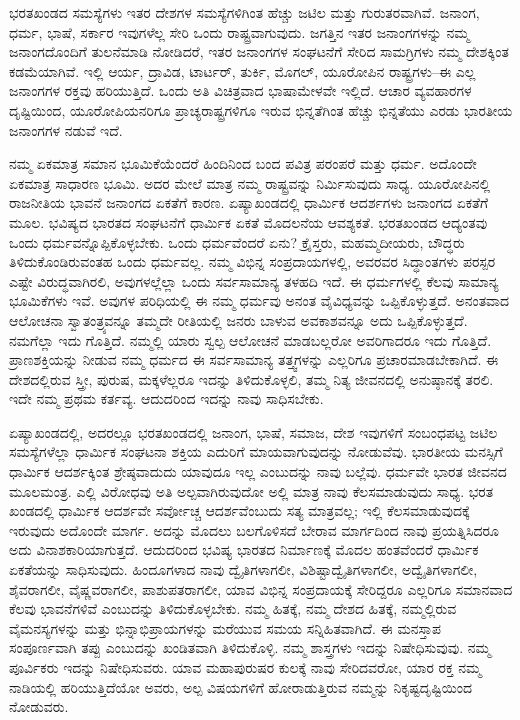 ಭರತಖಂಡದ ಸಮಸ್ಯೆಗಳು ಇತರ ದೇಶಗಳ ಸಮಸ್ಯೆಗಳಿಗಿಂತ ಹೆಚ್ಚು ಜಟಿಲ ಮತ್ತು ಗುರುತರವಾಗಿವೆ. ಜನಾಂಗ, ಧರ್ಮ, ಭಾಷೆ, ಸರ್ಕಾರ ಇವುಗಳೆಲ್ಲ ಸೇರಿ ಒಂದು ರಾಷ್ಟ್ರವಾಗುವುದು. ಜಗತ್ತಿನ ಇತರ ಜನಾಂಗಗಳನ್ನು ನಮ್ಮ ಜನಾಂಗದೊಂದಿಗೆ ತುಲನೆಮಾಡಿ ನೋಡಿದರೆ, ಇತರ ಜನಾಂಗಗಳ ಸಂಘಟನೆಗೆ ಸೇರಿದ ಸಾಮಗ್ರಿಗಳು ನಮ್ಮ ದೇಶಕ್ಕಿಂತ ಕಡಮೆಯಾಗಿವೆ. ಇಲ್ಲಿ ಆರ್ಯ, ದ್ರಾವಿಡ, ಟಾರ್ಟರ್​, ತುರ್ಕಿ, ಮೊಗಲ್​, ಯೂರೋಪಿನ ರಾಷ್ಟ್ರಗಳು–ಈ ಎಲ್ಲ ಜನಾಂಗಗಳ ರಕ್ತವು ಹರಿಯುತ್ತಿದೆ. ಒಂದು ಅತಿ ವಿಚಿತ್ರವಾದ ಭಾಷಾಮೇಳವೇ ಇಲ್ಲಿದೆ. ಆಚಾರ ವ್ಯವಹಾರಗಳ ದೃಷ್ಟಿಯಿಂದ, ಯೂರೋಪಿಯನರಿಗೂ ಪ್ರಾಚ್ಯರಾಷ್ಟ್ರಗಳಿಗೂ ಇರುವ ಭಿನ್ನತೆಗಿಂತ ಹೆಚ್ಚು ಭಿನ್ನತೆಯು ಎರಡು ಭಾರತೀಯ ಜನಾಂಗಗಳ ನಡುವೆ ಇದೆ.

ನಮ್ಮ ಏಕಮಾತ್ರ ಸಮಾನ ಭೂಮಿಕೆಯೆಂದರೆ ಹಿಂದಿನಿಂದ ಬಂದ ಪವಿತ್ರ ಪರಂಪರೆ ಮತ್ತು ಧರ್ಮ. ಅದೊಂದೇ ಏಕಮಾತ್ರ ಸಾಧಾರಣ ಭೂಮಿ. ಅದರ ಮೇಲೆ ಮಾತ್ರ ನಮ್ಮ ರಾಷ್ಟ್ರವನ್ನು ನಿರ್ಮಿಸುವುದು ಸಾಧ್ಯ. ಯೂರೋಪಿನಲ್ಲಿ ರಾಜನೀತಿಯ ಭಾವನೆ ಜನಾಂಗದ ಏಕತೆಗೆ ಕಾರಣ. ಏಷ್ಯಾಖಂಡದಲ್ಲಿ ಧಾರ್ಮಿಕ ಆದರ್ಶಗಳು ಜನಾಂಗದ ಏಕತೆಗೆ ಮೂಲ. ಭವಿಷ್ಯದ ಭಾರತದ ಸಂಘಟನೆಗೆ ಧಾರ್ಮಿಕ ಏಕತೆ ಮೊದಲನೆಯ ಆವಶ್ಯಕತೆ. ಭರತಖಂಡದ ಆದ್ಯಂತವು ಒಂದು ಧರ್ಮವನ್ನೊಪ್ಪಿಕೊಳ್ಳಬೇಕು. ಒಂದು ಧರ್ಮವೆಂದರೆ ಏನು? ಕ್ರೈಸ್ತರು, ಮಹಮ್ಮದೀಯರು, ಬೌದ್ಧರು ತಿಳಿದುಕೊಂಡಿರುವಂತಹ ಒಂದು ಧರ್ಮವಲ್ಲ. ನಮ್ಮ ವಿಭಿನ್ನ ಸಂಪ್ರದಾಯಗಳಲ್ಲಿ, ಅವರವರ ಸಿದ್ಧಾಂತಗಳು ಪರಸ್ಪರ ಎಷ್ಟೇ ವಿರುದ್ಧವಾಗಿರಲಿ, ಅವುಗಳಲ್ಲೆಲ್ಲಾ ಒಂದು ಸರ್ವಸಾಮಾನ್ಯ ತಳಹದಿ ಇದೆ. ಈ ಧರ್ಮಗಳಲ್ಲಿ ಕೆಲವು ಸಾಮಾನ್ಯ ಭೂಮಿಕೆಗಳು ಇವೆ. ಅವುಗಳ ಪರಿಧಿಯಲ್ಲಿ ಈ ನಮ್ಮ ಧರ್ಮವು ಅನಂತ ವೈವಿಧ್ಯವನ್ನು ಒಪ್ಪಿಕೊಳ್ಳುತ್ತದೆ. ಅನಂತವಾದ ಆಲೋಚನಾ ಸ್ವಾತಂತ್ರ್ಯವನ್ನೂ ತಮ್ಮದೇ ರೀತಿಯಲ್ಲಿ ಜನರು ಬಾಳುವ ಅವಕಾಶವನ್ನೂ ಅದು ಒಪ್ಪಿಕೊಳ್ಳುತ್ತದೆ. ನಮಗೆಲ್ಲಾ ಇದು ಗೊತ್ತಿದೆ. ನಮ್ಮಲ್ಲಿ ಯಾರು ಸ್ವಲ್ಪ ಆಲೋಚನೆ ಮಾಡಬಲ್ಲರೋ ಅವರಿಗಾದರೂ ಇದು ಗೊತ್ತಿದೆ. ಪ್ರಾಣಶಕ್ತಿಯನ್ನು ನೀಡುವ ನಮ್ಮ ಧರ್ಮದ ಈ ಸರ್ವಸಾಮಾನ್ಯ ತತ್ತ್ವಗಳನ್ನು ಎಲ್ಲರಿಗೂ ಪ್ರಚಾರಮಾಡಬೇಕಾಗಿದೆ. ಈ ದೇಶದಲ್ಲಿರುವ ಸ್ತ್ರೀ, ಪುರುಷ, ಮಕ್ಕಳೆಲ್ಲರೂ ಇದನ್ನು ತಿಳಿದುಕೊಳ್ಳಲಿ, ತಮ್ಮ ನಿತ್ಯ ಜೀವನದಲ್ಲಿ ಅನುಷ್ಠಾನಕ್ಕೆ ತರಲಿ. ಇದೇ ನಮ್ಮ ಪ್ರಥಮ ಕರ್ತವ್ಯ. ಆದುದರಿಂದ ಇದನ್ನು ನಾವು ಸಾಧಿಸಬೇಕು.

ಏಷ್ಯಾಖಂಡದಲ್ಲಿ, ಅದರಲ್ಲೂ ಭರತಖಂಡದಲ್ಲಿ ಜನಾಂಗ, ಭಾಷೆ, ಸಮಾಜ, ದೇಶ ಇವುಗಳಿಗೆ ಸಂಬಂಧಪಟ್ಟ ಜಟಿಲ ಸಮಸ್ಯೆಗಳೆಲ್ಲಾ ಧಾರ್ಮಿಕ ಸಂಘಟನಾ ಶಕ್ತಿಯ ಎದುರಿಗೆ ಮಾಯವಾಗುವುದನ್ನು ನೋಡುವೆವು. ಭಾರತೀಯ ಮನಸ್ಸಿಗೆ ಧಾರ್ಮಿಕ ಆದರ್ಶಕ್ಕಿಂತ ಶ್ರೇಷ್ಠವಾದುದು ಯಾವುದೂ ಇಲ್ಲ ಎಂಬುದನ್ನು ನಾವು ಬಲ್ಲೆವು. ಧರ್ಮವೇ ಭಾರತ ಜೀವನದ ಮೂಲಮಂತ್ರ. ಎಲ್ಲಿ ವಿರೋಧವು ಅತಿ ಅಲ್ಪವಾಗಿರುವುದೋ ಅಲ್ಲಿ ಮಾತ್ರ ನಾವು ಕೆಲಸಮಾಡುವುದು ಸಾಧ್ಯ. ಭರತ ಖಂಡದಲ್ಲಿ ಧಾರ್ಮಿಕ ಆದರ್ಶವೇ ಸರ್ವೋಚ್ಚ ಆದರ್ಶವೆಂಬುದು ಸತ್ಯ ಮಾತ್ರವಲ್ಲ; ಇಲ್ಲಿ ಕೆಲಸಮಾಡುವುದಕ್ಕೆ ಇರುವುದು ಅದೊಂದೇ ಮಾರ್ಗ. ಅದನ್ನು ಮೊದಲು ಬಲಗೊಳಿಸದೆ ಬೇರಾವ ಮಾರ್ಗದಿಂದ ನಾವು ಪ್ರಯತ್ನಿಸಿದರೂ ಅದು ವಿನಾಶಕಾರಿಯಾಗುತ್ತದೆ. ಆದುದರಿಂದ ಭವಿಷ್ಯ ಭಾರತದ ನಿರ್ಮಾಣಕ್ಕೆ ಮೊದಲ ಹಂತವೆಂದರೆ ಧಾರ್ಮಿಕ ಏಕತೆಯನ್ನು ಸಾಧಿಸುವುದು. ಹಿಂದೂಗಳಾದ ನಾವು ದ್ವೈತಿಗಳಾಗಲೀ, ವಿಶಿಷ್ಟಾದ್ವೈತಿಗಳಾಗಲೀ, ಅದ್ವೈತಿಗಳಾಗಲೀ, ಶೈವರಾಗಲೀ, ವೈಷ್ಣವರಾಗಲೀ, ಪಾಶುಪತರಾಗಲೀ, ಯಾವ ವಿಭಿನ್ನ ಸಂಪ್ರದಾಯಕ್ಕೆ ಸೇರಿದ್ದರೂ ಎಲ್ಲರಿಗೂ ಸಮಾನವಾದ ಕೆಲವು ಭಾವನೆಗಳಿವೆ ಎಂಬುದನ್ನು ತಿಳಿದುಕೊಳ್ಳಬೇಕು. ನಮ್ಮ ಹಿತಕ್ಕೆ, ನಮ್ಮ ದೇಶದ ಹಿತಕ್ಕೆ, ನಮ್ಮಲ್ಲಿರುವ ವೈಮನಸ್ಯಗಳನ್ನು ಮತ್ತು ಭಿನ್ನಾಭಿಪ್ರಾಯಗಳನ್ನು ಮರೆಯುವ ಸಮಯ ಸನ್ನಿಹಿತವಾಗಿದೆ. ಈ ಮನಸ್ತಾಪ ಸಂಪೂರ್ಣವಾಗಿ ತಪ್ಪು ಎಂಬುದನ್ನು ಖಂಡಿತವಾಗಿ ತಿಳಿದುಕೊಳ್ಳಿ. ನಮ್ಮ ಶಾಸ್ತ್ರಗಳು ಇದನ್ನು ನಿಷೇಧಿಸುವುವು. ನಮ್ಮ ಪೂರ್ವಿಕರು ಇದನ್ನು ನಿಷೇಧಿಸುವರು. ಯಾವ ಮಹಾಪುರುಷರ ಕುಲಕ್ಕೆ ನಾವು ಸೇರಿದವರೋ, ಯಾರ ರಕ್ತ ನಮ್ಮ ನಾಡಿಯಲ್ಲಿ ಹರಿಯುತ್ತಿದೆಯೋ ಅವರು, ಅಲ್ಪ ವಿಷಯಗಳಿಗೆ ಹೋರಾಡುತ್ತಿರುವ ನಮ್ಮನ್ನು ನಿಕೃಷ್ಟದೃಷ್ಟಿಯಿಂದ ನೋಡುವರು.

